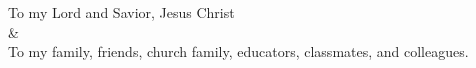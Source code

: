\begin{center}
    To my Lord and Savior, Jesus Christ \\
    \bigskip
    \&\\
    \bigskip
    To my family, friends, church family, educators, classmates, and colleagues.
\end{center}
\vspace{\fill}